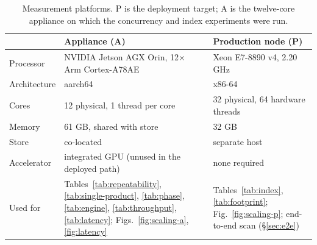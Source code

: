 \begin{table}[htbp]
\centering
\caption{Measurement platforms. P is the deployment target; A is the twelve-core appliance on which the concurrency and index experiments were run.}
\label{tab:platforms}
\footnotesize
\begin{tabular}{@{}p{2.0cm}p{5.5cm}p{5.5cm}@{}}
\hline
 & Appliance (A) & Production node (P) \\
\hline
Processor & NVIDIA Jetson AGX Orin, 12$\times$ Arm Cortex-A78AE & Xeon E7-8890 v4, 2.20 GHz \\
Architecture & aarch64 & x86-64 \\
Cores & 12 physical, 1 thread per core & 32 physical, 64 hardware threads \\
Memory & 61 GB, shared with store & 32 GB \\
Store & co-located & separate host \\
Accelerator & integrated GPU (unused in the deployed path) & none required \\
Used for & Tables~\ref{tab:repeatability}, \ref{tab:single-product}, \ref{tab:phase}, \ref{tab:engine}, \ref{tab:throughput}, \ref{tab:latency}; Figs.~\ref{fig:scaling-a}, \ref{fig:latency} & Tables~\ref{tab:index}, \ref{tab:footprint}; Fig.~\ref{fig:scaling-p}; end-to-end scan (\S\ref{sec:e2e}) \\
\hline
\end{tabular}
\end{table}
